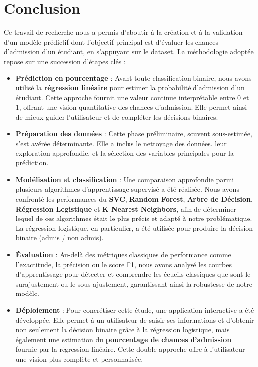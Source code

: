 \chapter*{Conclusion}

Ce travail de recherche nous a permis d'aboutir à la création et à la validation d'un modèle prédictif dont l'objectif principal est d'évaluer les chances d’admission d’un étudiant, en s’appuyant sur le dataset. La méthodologie adoptée repose sur une succession d'étapes clés :

\begin{itemize}
	\item \textbf{Prédiction en pourcentage} : Avant toute classification binaire, nous avons utilisé la \textbf{régression linéaire} pour estimer la probabilité d’admission d’un étudiant. Cette approche fournit une valeur continue interprétable entre 0 et 1, offrant une vision quantitative des chances d’admission. Elle permet ainsi de mieux guider l’utilisateur et de compléter les décisions binaires.
	
	\item \textbf{Préparation des données} : Cette phase préliminaire, souvent sous-estimée, s’est avérée déterminante. Elle a inclus le nettoyage des données, leur exploration approfondie, et la sélection des variables principales pour la prédiction.
	
	\item \textbf{Modélisation et classification} : Une comparaison approfondie parmi plusieurs algorithmes d’apprentissage supervisé a été réalisée. Nous avons confronté les performances du \textbf{SVC}, \textbf{Random Forest}, \textbf{Arbre de Décision}, \textbf{Régression Logistique} et \textbf{K Nearest Neighbors}, afin de déterminer lequel de ces algorithmes était le plus précis et adapté à notre problématique. La régression logistique, en particulier, a été utilisée pour produire la décision binaire (admis / non admis).
	
	\item \textbf{Évaluation} : Au-delà des métriques classiques de performance comme l’exactitude, la précision ou le score F1, nous avons analysé les courbes d’apprentissage pour détecter et comprendre les écueils classiques que sont le surajustement ou le sous-ajustement, garantissant ainsi la robustesse de notre modèle.
	
	\item \textbf{Déploiement} : Pour concrétiser cette étude, une application interactive a été développée. Elle permet à un utilisateur de saisir ses informations et d’obtenir non seulement la décision binaire grâce à la régression logistique, mais également une estimation du \textbf{pourcentage de chances d’admission} fournie par la régression linéaire. Cette double approche offre à l’utilisateur une vision plus complète et personnalisée.
\end{itemize}


